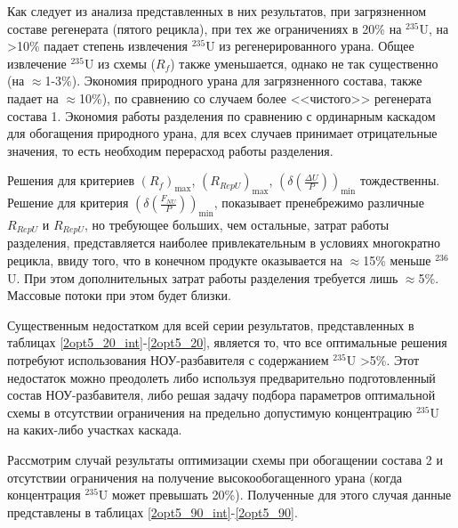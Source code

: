 Как следует из анализа представленных в них результатов, при загрязненном составе регенерата (пятого рецикла), при тех же ограничениях в 20\% на $^{235}$U, на >10\% падает степень извлечения $^{235}$U из регенерированного урана. Общее извлечение  $^{235}$U из схемы ($R_f$) также уменьшается, однако не так существенно (на $\approx$1-3\%). Экономия природного урана для загрязненного состава, также падает на $\approx$10\%), по сравнению со случаем более <<чистого>> регенерата состава 1. Экономия работы разделения по сравнению с ординарным каскадом для обогащения природного урана, для всех случаев принимает отрицательные значения, то есть необходим перерасход работы разделения.

Решения для критериев $(R_f)_\text{max}$, $(R_{RepU})_\text{max}$, $(\delta(\frac{\Delta U}{P}))_\text{min}$ тождественны. Решение для критерия $(\delta(\frac{F_{NU}}{P}))_\text{min}$, показывает пренебрежимо различные $R_{RepU}$ и $R_{RepU}$, но требующее больших, чем остальные, затрат работы разделения, представляется наиболее привлекательным в условиях многократно рецикла, ввиду того, что в конечном продукте оказывается на $\approx$15\% меньше $^{236}$U. При этом дополнительных затрат работы разделения требуется лишь $\approx$5\%. Массовые потоки при этом будет близки.

Существенным недостатком для всей серии результатов, представленных в таблицах \ref*{2opt5_20_int}-\ref*{2opt5_20}, является то, что все оптимальные решения потребуют использования НОУ-разбавителя с содержанием $^{235}$U >5\%. Этот недостаток можно преодолеть либо используя предварительно подготовленный состав НОУ-разбавителя, либо решая задачу подбора параметров оптимальной схемы в отсутствии ограничения на предельно допустимую концентрацию $^{235}$U на каких-либо участках каскада.

Рассмотрим случай результаты оптимизации схемы при обогащении состава 2 и отсутствии ограничения на получение высокообогащенного урана (когда концентрация $^{235}$U может превышать 20\%). Полученные для этого случая данные представлены в таблицах \ref*{2opt5_90_int}-\ref*{2opt5_90}.

